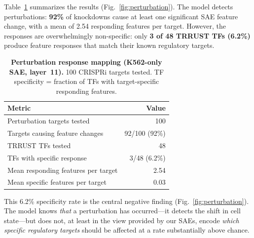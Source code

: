 \documentclass[onecolumn]{article}
\begin{document}
Table~\ref{tab:perturbation} summarizes the results (Fig.~\ref{fig:perturbation}). The model detects perturbations: \textbf{92\%} of knockdowns cause at least one significant SAE feature change, with a mean of 2.54 responding features per target. However, the responses are overwhelmingly non-specific: only \textbf{3 of 48 TRRUST TFs (6.2\%)} produce feature responses that match their known regulatory targets.

\begin{table}[t]
\centering
\caption{\textbf{Perturbation response mapping (K562-only SAE, layer~11).} 100 CRISPRi targets tested. TF specificity = fraction of TFs with target-specific responding features.}
\label{tab:perturbation}
\smallskip
\begin{tabular}{lr}
\toprule
Metric & Value \\
\midrule
Perturbation targets tested & 100 \\
Targets causing feature changes & 92/100 (92\%) \\
TRRUST TFs tested & 48 \\
TFs with specific response & 3/48 (6.2\%) \\
Mean responding features per target & 2.54 \\
Mean specific features per target & 0.03 \\
\bottomrule
\end{tabular}
\end{table}

This 6.2\% specificity rate is the central negative finding (Fig.~\ref{fig:perturbation}). The model knows \emph{that} a perturbation has occurred---it detects the shift in cell state---but does not, at least in the view provided by our SAEs, encode \emph{which specific regulatory targets} should be affected at a rate substantially above chance.
\end{document}
